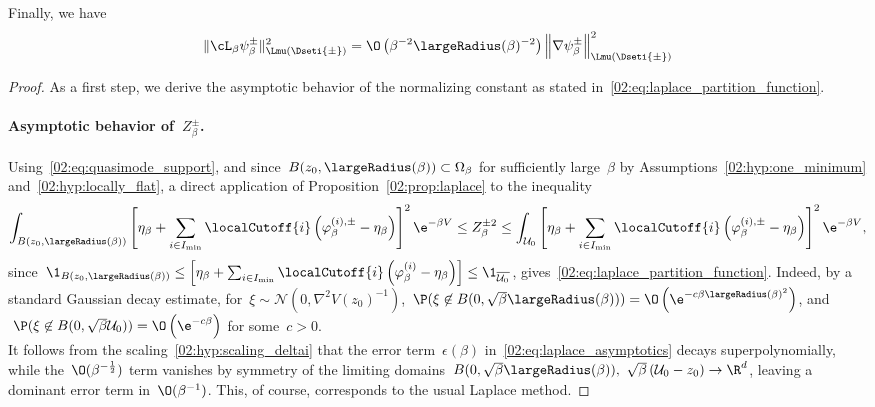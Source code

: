 \begin{proposition}
            Finally, we have
            \begin{equation}
                \label{02:eq:laplace_generator_local_estimate}
                \|\cL_\beta \psi_\beta^\pm\|^2_{\Lmu(\Dseti{\pm})} = \O\left(\beta^{-2}\largeRadius(\beta)^{-2}\right)\left\|\nabla\psi_\beta^\pm\right\|^2_{\Lmu(\Dseti{\pm})}
            \end{equation}
        \end{proposition}
        \begin{proof}
            As a first step, we derive the asymptotic behavior of the normalizing constant as stated in~\eqref{02:eq:laplace_partition_function}.
            \paragraph{Asymptotic behavior of~$Z_\beta^\pm$.\newline}
            Using~\eqref{02:eq:quasimode_support}, and since~$B(z_0,\largeRadius(\beta))\subset \Omega_\beta$ for sufficiently large~$\beta$ by Assumptions~\eqref{02:hyp:one_minimum} and~\eqref{02:hyp:locally_flat}, a direct application of Proposition~\ref{02:prop:laplace} to the inequality
            \[ \int_{B(z_0,\largeRadius(\beta))} \left[\eta_\beta+\sum_{i\in I_{\min}}\localCutoff{i}\left(\varphi_\beta^{(i),\pm}- \eta_\beta\right)\right]^2 \e^{-\beta V} \leq Z_\beta^{\pm 2}  \leq \int_{{\mathcal U_0}}\left[\eta_\beta+\sum_{i\in I_{\min}}\localCutoff{i}\left(\varphi_\beta^{(i),\pm}- \eta_\beta\right)\right]^2\e^{-\beta V},\]
            since~$ \1_{B(z_0,\largeRadius(\beta))} \leq \left[\eta_\beta+\sum_{i\in I_{\min}}\localCutoff{i}\left(\varphi_\beta^{(i)}- \eta_\beta\right)\right] \leq \1_{\overline{\mathcal U_0}}$,
            gives~\eqref{02:eq:laplace_partition_function}. Indeed, by a standard Gaussian decay estimate, for~$\xi\sim\mathcal N(0,\nabla^2 V(z_0)^{-1})$,~$\P(\xi\not\in B(0,\sqrt\beta\largeRadius(\beta)))=\O\left(\e^{-c\beta\largeRadius(\beta)^2}\right)$, and $~\P(\xi\not\in B(0,\sqrt\beta {\mathcal U_0})) = \O\left(\e^{-c\beta}\right)$ for some~$c>0$.
            \\It follows from the scaling~\eqref{02:hyp:scaling_deltai} that the error term~$\epsilon(\beta)$ in~\eqref{02:eq:laplace_asymptotics} decays superpolynomially, while the~$\O(\beta^{-\frac12})$ term vanishes by symmetry of the limiting domains~$B(0,\sqrt\beta\largeRadius(\beta)),~\sqrt\beta\left({\mathcal U_0}-z_0\right)\to \R^d$, leaving a dominant error term in~$\O(\beta^{-1})$. This, of course, corresponds to the usual Laplace method.


\end{proof}
